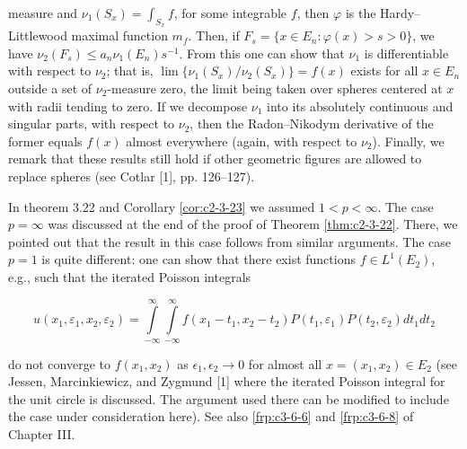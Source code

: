 measure and $\nu_1(S_x) = \int_{S_x} f$, for some integrable $f$, then $\varphi$ is the Hardy--Littlewood maximal function $m_f$. Then, if $F_s = \{x \in E_n: \varphi(x) > s > 0\}$, we have $\nu_2(F_s) \leq a_n \nu_1(E_n) s^{-1}$. From this one can show that $\nu_1$ is differentiable with respect to $\nu_2$; that is, $\lim \{\nu_1(S_x)/\nu_2(S_x)\} = f(x)$ exists for all $x \in E_n$ outside a set of $\nu_2$-measure zero, the limit being taken over spheres centered at $x$ with radii tending to zero. If we decompose $\nu_1$ into its absolutely continuous and singular parts, with respect to $\nu_2$, then the Radon--Nikodym derivative of the former equals $f(x)$ almost everywhere (again, with respect to $\nu_2$). Finally, we remark that these results still hold if other geometric figures are allowed to replace spheres (see Cotlar [1], pp. 126--127).

 In theorem 3.22 and Corollary \ref{cor:c2-3-23} we assumed $1 < p < \infty$. The case $p = \infty$ was discussed at the end of the proof of Theorem \ref{thm:c2-3-22}. There, we pointed out that the result in this case follows from similar arguments. The case $p = 1$ is quite different: one can show that there exist functions $f \in L^1(E_2)$, e.g., such that the iterated Poisson integrals

\[
u(x_{1},\varepsilon_{1},x_{2},\varepsilon_{2})=\int\limits_{-\infty}^{\infty}\int\limits_{-\infty}^{\infty}f(x_{1}-t_{1},x_{2}-t_{2})P(t_{1},\varepsilon_{1})P(t_{2},\varepsilon_{2})dt_{1}dt_{2}
\]

do not converge to $f(x_1, x_2)$ as $\epsilon_1, \epsilon_2 \to 0$ for almost all $x = (x_1, x_2) \in E_2$ (see Jessen, Marcinkiewicz, and Zygmund [1] where the iterated Poisson integral for the unit circle is discussed. The argument used there can be modified to include the case under consideration here). See also \eqref{frp:c3-6-6} and \eqref{frp:c3-6-8} of Chapter III.

